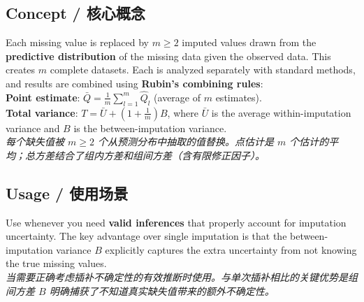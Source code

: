 \documentclass[9pt, a4paper]{article}
\begin{document}
\subsection{Concept / 核心概念}
\begin{tcolorbox}[defbox]
    Each missing value is replaced by $m \ge 2$ imputed values drawn from the \textbf{predictive distribution} of the missing data given the observed data. This creates $m$ complete datasets. Each is analyzed separately with standard methods, and results are combined using \textbf{Rubin's combining rules}:\\[3pt]
    \textbf{Point estimate}: $\bar{Q} = \frac{1}{m}\sum_{l=1}^{m} \hat{Q}_l$ (average of $m$ estimates).\\
    \textbf{Total variance}: $T = \bar{U} + (1 + \frac{1}{m})B$, where $\bar{U}$ is the average within-imputation variance and $B$ is the between-imputation variance.\\[3pt]
    \textit{每个缺失值被 $m \ge 2$ 个从预测分布中抽取的值替换。点估计是 $m$ 个估计的平均；总方差结合了组内方差和组间方差（含有限修正因子）。}
\end{tcolorbox}

\subsection{Usage / 使用场景}
Use whenever you need \textbf{valid inferences} that properly account for imputation uncertainty. The key advantage over single imputation is that the between-imputation variance $B$ explicitly captures the extra uncertainty from not knowing the true missing values.\\
\textit{当需要正确考虑插补不确定性的有效推断时使用。与单次插补相比的关键优势是组间方差 $B$ 明确捕获了不知道真实缺失值带来的额外不确定性。}
\end{document}
